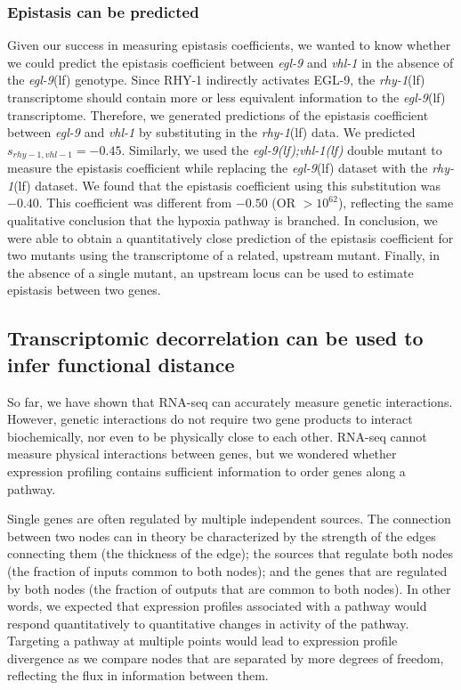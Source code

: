 \documentclass[9pt,twocolumn,twoside,lineno]{pnas-new}
\newcommand{\gene}[1]{\mbox{\emph{#1}}}
\newcommand{\egl}{\gene{egl-9}(lf)}
\newcommand{\rhy}{\gene{rhy-1}(lf)}
\newcommand{\eglvhl}{\gene{egl-9(lf);vhl-1(lf)}}
\newcommand{\eglp}{EGL-9}
\newcommand{\rhyp}{RHY-1}
\begin{document}
\subsubsection*{Epistasis can be predicted}
Given our success in measuring epistasis coefficients, we wanted to know whether
we could predict the epistasis coefficient between \gene{egl-9} and \gene{vhl-1}
in the absence of the \egl{} genotype. Since \rhyp{} indirectly activates
\eglp{}, the \rhy{} transcriptome should contain more or less equivalent
information to the \egl{} transcriptome. Therefore, we generated predictions of
the epistasis coefficient between \gene{egl-9} and \gene{vhl-1} by substituting
in the \rhy{} data. We predicted $s_{rhy-1,vhl-1} = -0.45$. Similarly, we used
the \eglvhl{} double mutant to measure the epistasis coefficient while replacing
the \egl{} dataset with the \rhy{} dataset. We found that the epistasis
coefficient using this substitution was $-0.40$. This coefficient was different
from $-0.50$ (OR $>10^{62}$), reflecting the same qualitative conclusion that
the hypoxia pathway is branched. In conclusion, we were able to obtain a
quantitatively close prediction of the epistasis coefficient for two mutants
using the transcriptome of a related, upstream mutant. Finally, in the absence
of a single mutant, an upstream locus can be used to estimate epistasis between
two genes.

\subsection*{Transcriptomic decorrelation can be used to infer functional distance}
\label{sub:decorrelation}
So far, we have shown that RNA-seq can accurately measure genetic interactions.
However, genetic interactions do not require two gene products to interact
biochemically, nor even to be physically close to each other. RNA-seq cannot
measure physical interactions between genes, but we wondered whether expression
profiling contains sufficient information to order genes along a pathway.

Single genes are often regulated by multiple independent sources. The connection
between two nodes can in theory be characterized by the strength of the edges
connecting them (the thickness of the edge); the sources that regulate both
nodes (the fraction of inputs common to both nodes); and the genes that are
regulated by both nodes (the fraction of outputs that are common to both nodes).
In other words, we expected that expression profiles associated with a pathway
would respond quantitatively to quantitative changes in activity of the pathway.
Targeting a pathway at multiple points would lead to expression profile
divergence as we compare nodes that are separated by more degrees of freedom,
reflecting the flux in information between them.
\end{document}
